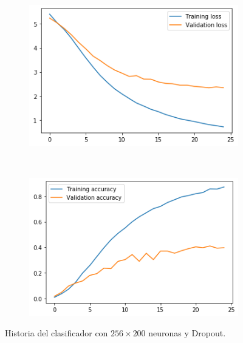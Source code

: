 \documentclass[11pt,a4paper]{article}
\begin{document}
\begin{figure}[H]
  \centering
  \begin{subfigure}{.5\textwidth}
    \centering
    \includegraphics[scale=0.4]{img/feat-m1drop-loss.png}
    \label{fig:feat-m1drop-loss}
  \end{subfigure}%
  ~ \quad
  \begin{subfigure}{.5\textwidth}
    \centering
    \includegraphics[scale=0.4]{img/feat-m1drop-acc.png}
    \label{fig:feat-m1drop-acc}
  \end{subfigure}
  \caption{Historia del clasificador con $256 \times 200$ neuronas y Dropout.}
  \label{fig:history-feat-m1drop}
\end{figure}
\end{document}

